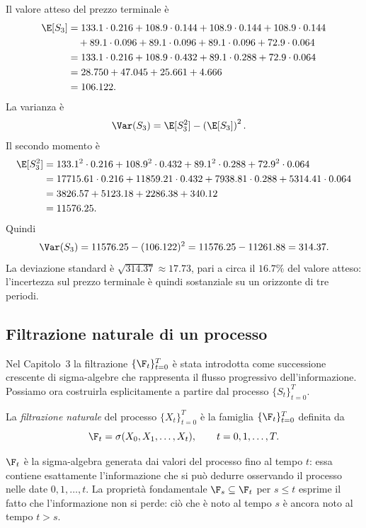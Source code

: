 \begin{example}
Il valore atteso del prezzo terminale \`{e}
\begin{align*}
\E[S_3]
&=133.1\cdot 0.216+108.9\cdot 0.144+108.9\cdot 0.144
+108.9\cdot 0.144\\
&\quad+89.1\cdot 0.096+89.1\cdot 0.096+89.1\cdot 0.096
+72.9\cdot 0.064\\
&=133.1\cdot 0.216+108.9\cdot 0.432+89.1\cdot 0.288
+72.9\cdot 0.064\\
&=28.750+47.045+25.661+4.666\\
&=106.122.
\end{align*}
La varianza \`{e}
\begin{align*}
\Var(S_3)
&=\E[S_3^2]-\left(\E[S_3]\right)^2.
\end{align*}
Il secondo momento \`{e}
\begin{align*}
\E[S_3^2]
&=133.1^2\cdot 0.216+108.9^2\cdot 0.432
+89.1^2\cdot 0.288+72.9^2\cdot 0.064\\
&=17715.61\cdot 0.216+11859.21\cdot 0.432
+7938.81\cdot 0.288+5314.41\cdot 0.064\\
&=3826.57+5123.18+2286.38+340.12\\
&=11576.25.
\end{align*}
Quindi
\[
\Var(S_3)=11576.25-(106.122)^2=11576.25-11261.88=314.37.
\]
La deviazione standard \`{e} $\sqrt{314.37}\approx 17.73$, pari a
circa il $16.7\%$ del valore atteso: l'incertezza sul prezzo terminale
\`{e} quindi sostanziale su un orizzonte di tre periodi.
\end{example}

\subsection{Filtrazione naturale di un processo}

Nel Capitolo~3 la filtrazione $\{\F_t\}_{t=0}^{T}$ \`{e} stata
introdotta come successione crescente di sigma-algebre che rappresenta
il flusso progressivo dell'informazione. Possiamo ora costruirla
esplicitamente a partire dal processo $\{S_t\}_{t=0}^{T}$.

\begin{definition}
\label{def:filtrazione-naturale}
La \emph{filtrazione naturale} del processo $\{X_t\}_{t=0}^{T}$ \`{e}
la famiglia $\{\F_t\}_{t=0}^{T}$ definita da
\[
\F_t=\sigma(X_0,X_1,\ldots,X_t), \qquad t=0,1,\ldots,T.
\]
\end{definition}

$\F_t$ \`{e} la sigma-algebra generata dai valori del processo fino al
tempo $t$: essa contiene esattamente l'informazione che si pu\`{o}
dedurre osservando il processo nelle date $0,1,\ldots,t$. La propriet\`{a}
fondamentale $\F_s\subseteq\F_t$ per $s\leq t$ esprime il fatto che
l'informazione non si perde: ci\`{o} che \`{e} noto al tempo $s$ \`{e}
ancora noto al tempo $t>s$.

